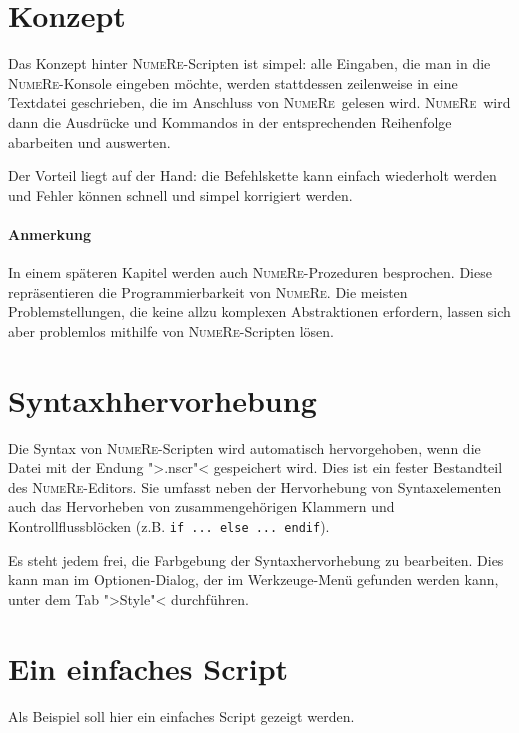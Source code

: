 \documentclass[DIV=14,headsepline,footsepline]{scrbook}
\newcommand{\NR}{\textsc{Nu\-me\-Re}}
\begin{document}
			\section{Konzept}
				Das Konzept hinter \NR-Scripten ist simpel: alle Eingaben, die man in die \NR-Konsole eingeben möchte, werden stattdessen zeilenweise in eine Textdatei geschrieben, die im Anschluss von \NR\ gelesen wird. \NR\ wird dann die Ausdrücke und Kommandos in der entsprechenden Reihenfolge abarbeiten und auswerten.
				
				Der Vorteil liegt auf der Hand: die Befehlskette kann einfach wiederholt werden und Fehler können schnell und simpel korrigiert werden.
				\paragraph{Anmerkung}
					In einem späteren Kapitel werden auch \NR-Prozeduren besprochen. Diese repräsentieren die Programmierbarkeit von \NR. Die meisten Problemstellungen, die keine allzu komplexen Abstraktionen erfordern, lassen sich aber problemlos mithilfe von \NR-Scripten lösen.
				
			\section{Syntaxhhervorhebung}
				Die Syntax von \NR-Scripten wird automatisch hervorgehoben, wenn die Datei mit der Endung ">.nscr"< gespeichert wird. Dies ist ein fester Bestandteil des \NR-Editors. Sie umfasst neben der Hervorhebung von Syntaxelementen auch das Hervorheben von zusammengehörigen Klammern und Kontrollflussblöcken (z.B. \verb+if ... else ... endif+).
				
				Es steht jedem frei, die Farbgebung der Syntaxhervorhebung zu bearbeiten. Dies kann man im Optionen-Dialog, der im Werkzeuge-Menü gefunden werden kann, unter dem Tab ">Style"< durchführen. 
			\section{Ein einfaches Script}
				Als Beispiel soll hier ein einfaches Script gezeigt werden.
				
\end{document}

